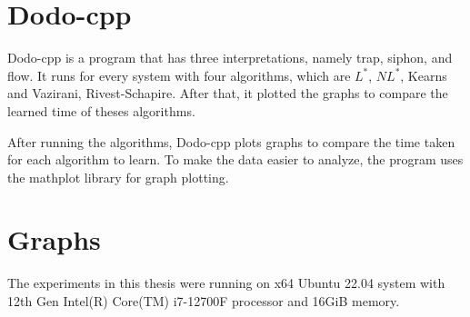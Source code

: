 \section{Dodo-cpp}
Dodo-cpp is a program that has three interpretations, namely trap, siphon, and flow. 
It runs for every system with four algorithms, which are $L^*$, $NL^*$, Kearns and Vazirani, Rivest-Schapire. 
After that, it plotted the graphs to compare the learned time 
of theses algorithms.

After running the algorithms, 
Dodo-cpp plots graphs to compare the time taken for each algorithm to learn. 
To make the data easier to analyze, the program uses the mathplot library \cite*{Hunter:2007} for graph plotting.


\section{Graphs}
The experiments in this thesis were running on x64 Ubuntu 22.04 system with 12th Gen Intel(R) Core(TM) i7-12700F processor
and 16GiB memory.

